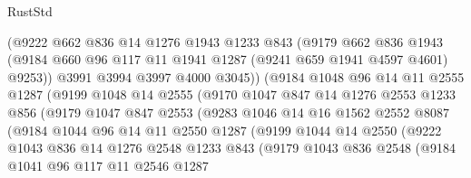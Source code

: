 \begin{lexlean}{RustStd}
\begin{coremodule}
                    (@9222
                      @662
                      @836
                      @14
                      @1276
                      @1943
                      @1233
                      @843
                      (@9179
                        @662
                        @836
                        @1943
                        (@9184 @660 @96 @117 @11 @1941 @1287 (@9241 @659 @1941 @4597 @4601) @9253))
                      @3991
                      @3994
                      @3997
                      @4000
                      @3045))
                  (@9184
                    @1048
                    @96
                    @14
                    @11
                    @2555
                    @1287
                    (@9199
                      @1048
                      @14
                      @2555
                      (@9170
                        @1047
                        @847
                        @14
                        @1276
                        @2553
                        @1233
                        @856
                        (@9179
                          @1047
                          @847
                          @2553
                          (@9283
                            @1046
                            @14
                            @16
                            @1562
                            @2552
                            @8087
                            (@9184
                              @1044
                              @96
                              @14
                              @11
                              @2550
                              @1287
                              (@9199
                                @1044
                                @14
                                @2550
                                (@9222
                                  @1043
                                  @836
                                  @14
                                  @1276
                                  @2548
                                  @1233
                                  @843
                                  (@9179
                                    @1043
                                    @836
                                    @2548
                                    (@9184
                                      @1041
                                      @96
                                      @117
                                      @11
                                      @2546
                                      @1287

\end{coremodule}
\end{lexlean}
